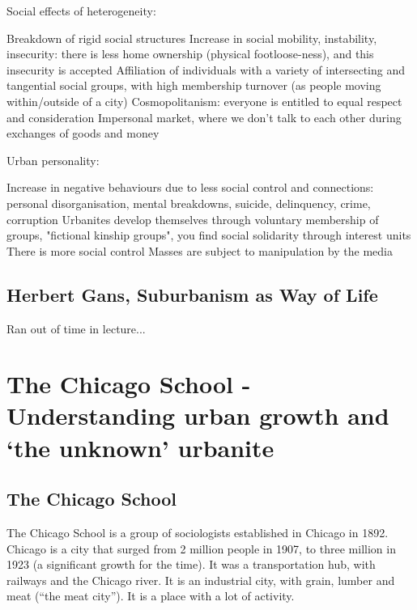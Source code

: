 \documentclass{article}
\begin{document}
Social effects of heterogeneity:
\begin{outline}
	\1 Breakdown of rigid social structures
	\1 Increase in social mobility, instability, insecurity: there is less home ownership (physical footloose-ness), and this insecurity is accepted
	\1 Affiliation of individuals with a variety of intersecting and tangential social groups, with high membership turnover (as people moving within/outside of a city)
	\1 Cosmopolitanism: everyone is entitled to equal respect and consideration
	\1 Impersonal market, where we don't talk to each other during exchanges of goods and money
\end{outline}

Urban personality:

\begin{outline}
	\1 Increase in negative behaviours due to less social control and connections: personal disorganisation, mental breakdowns, suicide, delinquency, crime, corruption
	\1 Urbanites develop themselves through voluntary membership of groups, "fictional kinship groups", you find social solidarity through interest units
	\1 There is more social control
	\1 Masses are subject to manipulation by the media
\end{outline}

\subsection{Herbert Gans, Suburbanism as Way of Life}

Ran out of time in lecture...


\section{The Chicago School - Understanding urban growth and `the unknown' urbanite}
\date{September 28th, 2021}

\subsection{The Chicago School}

The Chicago School is a group of sociologists established in Chicago in 1892. Chicago is a city that surged from 2 million people in 1907, to three million in 1923 (a significant growth for the time). It was a transportation hub, with railways and the Chicago river. It is an industrial city, with grain, lumber and meat (``the meat city''). It is a place with a lot of activity.
\end{document}
